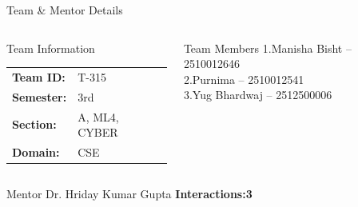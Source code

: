 \documentclass[aspectratio=169,11pt]{beamer}
\newcommand{\smallnote}[1]{%
\vspace{0.08cm}
{\scriptsize\color{GEUGrey}#1}
}
\begin{document}
\begin{frame}{Team \& Mentor Details}

\begin{columns}[T,totalwidth=\textwidth]


\begin{block}{Team Information}
\begin{tabular}{@{}ll@{}}
\textbf{Team ID:} & T-315\\
\textbf{Semester:} & 3rd\\
\textbf{Section:} & A, ML4, CYBER\\
\textbf{Domain:} & CSE
\end{tabular}
\end{block}


\begin{block}{Team Members}
1.\quad Manisha Bisht -- 2510012646\\
2.\quad Purnima -- 2510012541\\
3.\quad Yug Bhardwaj -- 2512500006
\end{block}

\end{columns}

\vspace{2mm}

\begin{block}{Mentor}
Dr. Hriday Kumar Gupta
\hfill
\textbf{Interactions:3} 
\end{block}

\vfill

\smallnote{

}

\end{frame}
\end{document}
